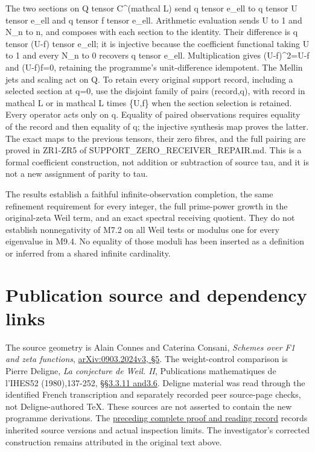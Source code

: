 The two sections on Q tensor C\^{}(mathcal L) send q tensor e\_ell to q
tensor U tensor e\_ell and q tensor f tensor e\_ell. Arithmetic
evaluation sends U to 1 and N\_n to n, and composes with each section to
the identity. Their difference is q tensor (U-f) tensor e\_ell; it is
injective because the coefficient functional taking U to 1 and every
N\_n to 0 recovers q tensor e\_ell. Multiplication gives (U-f)\^{}2=U-f
and (U-f)f=0, retaining the programme's unit-difference idempotent. The
Mellin jets and scaling act on Q. To retain every original support
record, including a selected section at q=0, use the disjoint family of
pairs (record,q), with record in mathcal L or in mathcal L times \{U,f\}
when the section selection is retained. Every operator acts only on q.
Equality of paired observations requires equality of the record and then
equality of q; the injective synthesis map proves the latter. The exact
maps to the previous tensors, their zero fibres, and the full pairing
are proved in ZR1-ZR5 of SUPPORT\_ZERO\_RECEIVER\_REPAIR.md. This is a
formal coefficient construction, not addition or subtraction of source
tau, and it is not a new assignment of parity to tau.

The results establish a faithful infinite-observation completion, the
same refinement requirement for every integer, the full prime-power
growth in the original-zeta Weil term, and an exact spectral receiving
quotient. They do not establish nonnegativity of M7.2 on all Weil tests
or modulus one for every eigenvalue in M9.4. No equality of those moduli
has been inserted as a definition or inferred from a shared infinite
cardinality.

\section{Publication source and dependency
links}\label{publication-source-and-dependency-links-7}

The source geometry is Alain Connes and Caterina Consani, \emph{Schemes
over F1 and zeta functions},
\href{https://arxiv.org/abs/0903.2024v3}{arXiv:0903.2024v3, §5}. The
weight-control comparison is Pierre Deligne, \emph{La conjecture de
Weil. II}, Publications mathematiques de l'IHES52 (1980),137-252,
\href{https://www.numdam.org/item/PMIHES_1980__52__137_0/}{§§3.3.11
and3.6}. Deligne material was read through the identified French
transcription and separately recorded peer source-page checks, not
Deligne-authored TeX. These sources are not asserted to contain the new
programme derivations. The
\href{https://github.com/KokunoYumeto/zeta-function-research-reader/blob/36a82ecca98addb8a98b48204e349737856c7223/workbenches/splitzero-tandem/continuations/20260924-cohomology-weight-and-character-lifts/BUILD_AND_REVIEW.md}{preceding
complete proof and reading record} records inherited source versions and
actual inspection limits. The investigator's corrected construction
remains attributed in the original text above.

